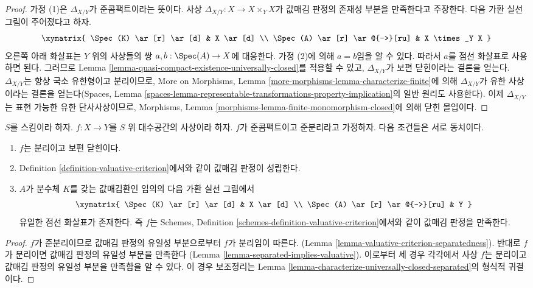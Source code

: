 \begin{proof}
가정 (1)은 $\Delta_{X/Y}$가 준콤팩트이라는 뜻이다. 사상
$\Delta_{X/Y} : X \to X \times_Y X$가 값매김 판정의 존재성 부분을
만족한다고 주장한다. 다음 가환 실선 그림이 주어졌다고 하자.
$$
\xymatrix{
\Spec(K) \ar[r] \ar[d] & X \ar[d] \\
\Spec(A) \ar[r] \ar@{-->}[ru] & X \times_Y X
}
$$
오른쪽 아래 화살표는 $Y$ 위의 사상들의 쌍
$a, b : \Spec(A) \to X$에 대응한다. 가정 (2)에 의해 $a = b$임을 알 수
있다. 따라서 $a$를 점선 화살표로 사용하면 된다. 그러므로 Lemma
\ref{lemma-quasi-compact-existence-universally-closed}를 적용할 수 있고,
$\Delta_{X/Y}$가 보편 닫힌이라는 결론을 얻는다. $\Delta_{X/Y}$는 항상
국소 유한형이고 분리이므로, More on Morphisms, Lemma
\ref{more-morphisms-lemma-characterize-finite}에 의해 $\Delta_{X/Y}$가 유한
사상이라는 결론을 얻는다(Spaces, Lemma
\ref{spaces-lemma-representable-transformations-property-implication}의 일반
원리도 사용한다). 이제 $\Delta_{X/Y}$는 표현 가능한 유한 단사사상이므로,
Morphisms, Lemma \ref{morphisms-lemma-finite-monomorphism-closed}에 의해
닫힌 몰입이다.
\end{proof}

\begin{lemma}
\label{lemma-characterize-separated-and-universally-closed}
$S$를 스킴이라 하자. $f : X \to Y$를 $S$ 위 대수공간의 사상이라 하자.
$f$가 준콤팩트이고 준분리라고 가정하자. 다음 조건들은 서로 동치이다.
\begin{enumerate}
\item $f$는 분리이고 보편 닫힌이다.
\item Definition \ref{definition-valuative-criterion}에서와 같이 값매김
판정이 성립한다.
\item $A$가 분수체 $K$를 갖는 값매김환인 임의의 다음 가환 실선 그림에서
$$
\xymatrix{
\Spec(K) \ar[r] \ar[d] & X \ar[d] \\
\Spec(A) \ar[r] \ar@{-->}[ru] & Y
}
$$
유일한 점선 화살표가 존재한다. 즉 $f$는 Schemes, Definition
\ref{schemes-definition-valuative-criterion}에서와 같이 값매김 판정을
만족한다.
\end{enumerate}
\end{lemma}

\begin{proof}
$f$가 준분리이므로 값매김 판정의 유일성 부분으로부터 $f$가 분리임이
따른다.
(Lemma \ref{lemma-valuative-criterion-separatedness}). 반대로 $f$가
분리이면 값매김 판정의 유일성 부분을 만족한다
(Lemma \ref{lemma-separated-implies-valuative}). 이로부터 세 경우 각각에서
사상 $f$는 분리이고 값매김 판정의 유일성 부분을 만족함을 알 수 있다.
이 경우 보조정리는 Lemma
\ref{lemma-characterize-universally-closed-separated}의 형식적 귀결이다.
\end{proof}

